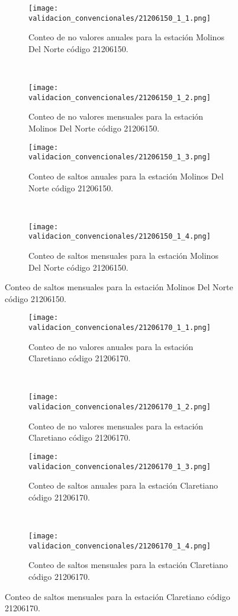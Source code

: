 \begin{figure}[H]\ContinuedFloat
\centering
	\begin{subfigure}[normla]{0.4\textwidth}
	\texttt{[image: validacion\_convencionales/21206150\_1\_1.png]}
		\caption{Conteo de no valores anuales para la estación Molinos Del Norte código 21206150.}
		\label{subfig:a1}
		\end{subfigure}
		~
    \begin{subfigure}[normla]{0.4\textwidth}
	\texttt{[image: validacion\_convencionales/21206150\_1\_2.png]}
		\caption{Conteo de no valores mensuales para la estación Molinos Del Norte código 21206150.}
		\label{subfig:a2}
		\end{subfigure}
		
    \begin{subfigure}[normla]{0.4\textwidth}
	\texttt{[image: validacion\_convencionales/21206150\_1\_3.png]}
		\caption{Conteo de saltos anuales para la estación Molinos Del Norte código 21206150.}
		\label{subfig:a1}
		\end{subfigure}
		~
    \begin{subfigure}[normla]{0.4\textwidth}
	\texttt{[image: validacion\_convencionales/21206150\_1\_4.png]}
		\caption{Conteo de saltos mensuales para la estación Molinos Del Norte código 21206150.}
		\label{subfig:a2}
		\end{subfigure}

	
\end{figure}
           
\begin{figure}[H]\ContinuedFloat
\centering
	\begin{subfigure}[normla]{0.4\textwidth}
	\texttt{[image: validacion\_convencionales/21206170\_1\_1.png]}
		\caption{Conteo de no valores anuales para la estación Claretiano código 21206170.}
		\label{subfig:a1}
		\end{subfigure}
		~
    \begin{subfigure}[normla]{0.4\textwidth}
	\texttt{[image: validacion\_convencionales/21206170\_1\_2.png]}
		\caption{Conteo de no valores mensuales para la estación Claretiano código 21206170.}
		\label{subfig:a2}
		\end{subfigure}
		
    \begin{subfigure}[normla]{0.4\textwidth}
	\texttt{[image: validacion\_convencionales/21206170\_1\_3.png]}
		\caption{Conteo de saltos anuales para la estación Claretiano código 21206170.}
		\label{subfig:a1}
		\end{subfigure}
		~
    \begin{subfigure}[normla]{0.4\textwidth}
	\texttt{[image: validacion\_convencionales/21206170\_1\_4.png]}
		\caption{Conteo de saltos mensuales para la estación Claretiano código 21206170.}
		\label{subfig:a2}
		\end{subfigure}

	
\end{figure}
           
